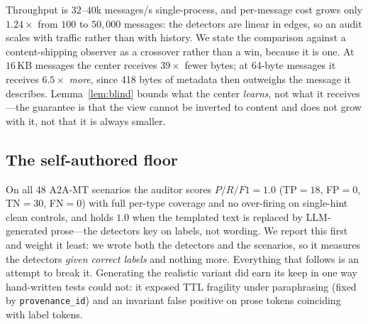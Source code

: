 \documentclass[sigconf,anonymous,review]{acmart}
\theoremstyle{acmplain}
\begin{document}
Throughput is $32$--$40$k messages/s single-process, and per-message cost grows
only $1.24\times$ from $100$ to $50{,}000$ messages: the detectors are linear in
edges, so an audit scales with traffic rather than with history. We state the
comparison against a content-shipping observer as a crossover rather than a win,
because it is one. At $16$\,KB messages the center receives $39\times$ fewer bytes;
at 64-byte messages it receives $6.5\times$ \emph{more}, since 418 bytes of metadata
then outweighs the message it describes. Lemma~\ref{lem:blind} bounds what the
center \emph{learns}, not what it receives---the guarantee is that the view cannot
be inverted to content and does not grow with it, not that it is always smaller.

\subsection{The self-authored floor}
On all 48 A2A-MT scenarios the auditor scores $P/R/F1=1.0$ (TP$=18$, FP$=0$,
TN$=30$, FN$=0$) with full per-type coverage and no over-firing on single-hint
clean controls, and holds $1.0$ when the templated text is replaced by
LLM-generated prose---the detectors key on labels, not wording. We report this
first and weight it least: we wrote both the detectors and the scenarios, so it
measures the detectors \emph{given correct labels} and nothing more. Everything
that follows is an attempt to break it. Generating the realistic variant did earn
its keep in one way hand-written tests could not: it exposed TTL fragility under
paraphrasing (fixed by \texttt{provenance\_id}) and an invariant false positive on
prose tokens coinciding with label tokens.
\end{document}
